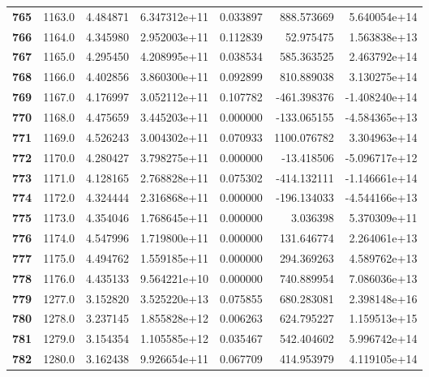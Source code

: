 \documentclass{report}[12pt]
\begin{document}
\begin{center}
\begin{tabular}{lrrrrrr}
\textbf{765 } &         1163.0 &   4.484871 &  6.347312e+11 &    0.033897 &   888.573669 &  5.640054e+14 \\
\textbf{766 } &         1164.0 &   4.345980 &  2.952003e+11 &    0.112839 &    52.975475 &  1.563838e+13 \\
\textbf{767 } &         1165.0 &   4.295450 &  4.208995e+11 &    0.038534 &   585.363525 &  2.463792e+14 \\
\textbf{768 } &         1166.0 &   4.402856 &  3.860300e+11 &    0.092899 &   810.889038 &  3.130275e+14 \\
\textbf{769 } &         1167.0 &   4.176997 &  3.052112e+11 &    0.107782 &  -461.398376 & -1.408240e+14 \\
\textbf{770 } &         1168.0 &   4.475659 &  3.445203e+11 &    0.000000 &  -133.065155 & -4.584365e+13 \\
\textbf{771 } &         1169.0 &   4.526243 &  3.004302e+11 &    0.070933 &  1100.076782 &  3.304963e+14 \\
\textbf{772 } &         1170.0 &   4.280427 &  3.798275e+11 &    0.000000 &   -13.418506 & -5.096717e+12 \\
\textbf{773 } &         1171.0 &   4.128165 &  2.768828e+11 &    0.075302 &  -414.132111 & -1.146661e+14 \\
\textbf{774 } &         1172.0 &   4.324444 &  2.316868e+11 &    0.000000 &  -196.134033 & -4.544166e+13 \\
\textbf{775 } &         1173.0 &   4.354046 &  1.768645e+11 &    0.000000 &     3.036398 &  5.370309e+11 \\
\textbf{776 } &         1174.0 &   4.547996 &  1.719800e+11 &    0.000000 &   131.646774 &  2.264061e+13 \\
\textbf{777 } &         1175.0 &   4.494762 &  1.559185e+11 &    0.000000 &   294.369263 &  4.589762e+13 \\
\textbf{778 } &         1176.0 &   4.435133 &  9.564221e+10 &    0.000000 &   740.889954 &  7.086036e+13 \\
\textbf{779 } &         1277.0 &   3.152820 &  3.525220e+13 &    0.075855 &   680.283081 &  2.398148e+16 \\
\textbf{780 } &         1278.0 &   3.237145 &  1.855828e+12 &    0.006263 &   624.795227 &  1.159513e+15 \\
\textbf{781 } &         1279.0 &   3.154354 &  1.105585e+12 &    0.035467 &   542.404602 &  5.996742e+14 \\
\textbf{782 } &         1280.0 &   3.162438 &  9.926654e+11 &    0.067709 &   414.953979 &  4.119105e+14 \\

\end{tabular}
\end{center}
\end{document}
